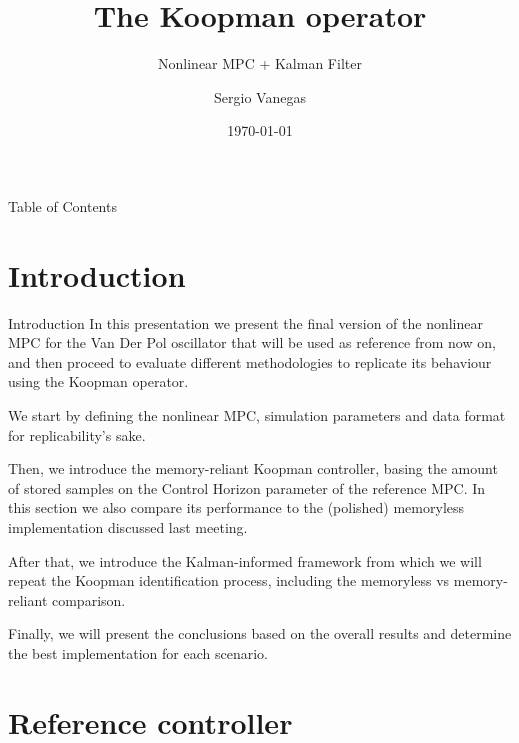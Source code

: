 \documentclass{beamer}
\title[Process]{The Koopman operator}
\subtitle{Nonlinear MPC + Kalman Filter}
\institute[Polimi]{Politecnico di Milano}
\author{Sergio Vanegas}
\date{\today}
\begin{document}
\begin{frame}
    \maketitle
\end{frame}

\begin{frame}{Table of Contents}
    \tableofcontents
\end{frame}


\section{Introduction}

\begin{frame}{Introduction}
    In this presentation we present the final version of the nonlinear MPC for the Van Der Pol oscillator that will be used as reference from now on, and then proceed to evaluate different methodologies to replicate its behaviour using the Koopman operator.

    We start by defining the nonlinear MPC, simulation parameters and data format for replicability's sake.

    Then, we introduce the memory-reliant Koopman controller, basing the amount of stored samples on the Control Horizon parameter of the reference MPC. In this section we also compare its performance to the (polished) memoryless implementation discussed last meeting.

    After that, we introduce the Kalman-informed framework from which we will repeat the Koopman identification process, including the memoryless vs memory-reliant comparison.

    Finally, we will present the conclusions based on the overall results and determine the best implementation for each scenario.
\end{frame}


\section{Reference controller}
\end{document}
